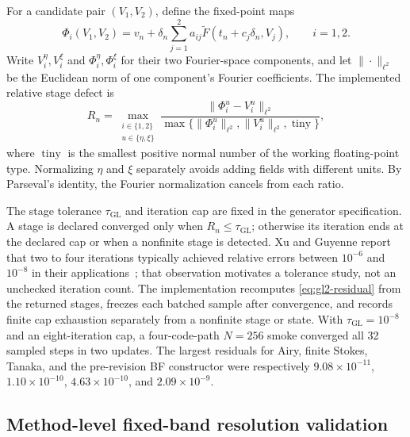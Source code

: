 \documentclass[11pt]{article}
\begin{document}
For a candidate pair $(V_1,V_2)$, define the fixed-point maps
\begin{equation}
  \Phi_i(V_1,V_2)
  =v_n+\delta_n\sum_{j=1}^{2}a_{ij}
       \widetilde F(t_n+c_j\delta_n,V_j),
  \qquad i=1,2.
  \label{eq:gl2-stage-map}
\end{equation}
Write $V_i^\eta,V_i^\xi$ and $\Phi_i^\eta,\Phi_i^\xi$ for their two
Fourier-space components, and let $\|\cdot\|_{\ell^2}$ be the Euclidean norm
of one component's Fourier coefficients.  The implemented relative stage
defect is
\begin{equation}
  R_n
  =
  \max_{\substack{i\in\{1,2\}\\u\in\{\eta,\xi\}}}
  \frac{\|\Phi_i^u-V_i^u\|_{\ell^2}}
       {\max\{\|\Phi_i^u\|_{\ell^2},
              \|V_i^u\|_{\ell^2},
              \operatorname{tiny}\}},
  \label{eq:gl2-residual}
\end{equation}
where $\operatorname{tiny}$ is the smallest positive normal number of the
working floating-point type.  Normalizing $\eta$ and $\xi$ separately avoids
adding fields with different units.  By Parseval's identity, the Fourier
normalization cancels from each ratio.

The stage tolerance $\tau_{\mathrm{GL}}$ and iteration cap are fixed in the
generator specification.  A stage is declared converged only when
$R_n\leq\tau_{\mathrm{GL}}$; otherwise its iteration ends at the declared cap
or when a nonfinite stage is detected.  Xu and Guyenne report that two to four
iterations typically achieved relative errors between $10^{-6}$ and
$10^{-8}$ in their applications~\cite{xu2009}; that observation motivates a
tolerance study, not an unchecked iteration count.  The implementation
recomputes \eqref{eq:gl2-residual} from the returned stages, freezes each
batched sample after convergence, and records finite cap exhaustion
separately from a nonfinite stage or state.  With
$\tau_{\mathrm{GL}}=10^{-8}$ and an eight-iteration cap, a four-code-path
$N=256$ smoke converged all 32 sampled steps in two updates.  The largest
residuals for Airy, finite Stokes, Tanaka, and the pre-revision BF
constructor were respectively
$9.08\times10^{-11}$, $1.10\times10^{-10}$,
$4.63\times10^{-10}$, and $2.09\times10^{-9}$.

\subsection{Method-level fixed-band resolution validation}
\end{document}
